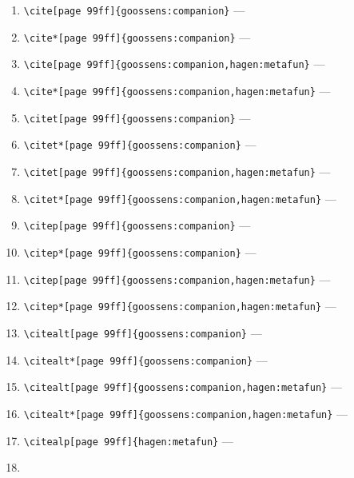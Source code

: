 \documentclass[12pt]{article}
\begin{document}
\begin{enumerate}
\item
\verb|\cite[page 99ff]{goossens:companion}| ---
\cite[page 99ff]{goossens:companion}
\item
\verb|\cite*[page 99ff]{goossens:companion}| ---
\cite*[page 99ff]{goossens:companion}
\item
\verb|\cite[page 99ff]{goossens:companion,hagen:metafun}| ---
\cite[page 99ff]{goossens:companion,hagen:metafun}
\item
\verb|\cite*[page 99ff]{goossens:companion,hagen:metafun}| ---
\cite*[page 99ff]{goossens:companion,hagen:metafun}
\item
\verb|\citet[page 99ff]{goossens:companion}| ---
\citet[page 99ff]{goossens:companion}
\item
\verb|\citet*[page 99ff]{goossens:companion}| ---
\citet*[page 99ff]{goossens:companion}
\item
\verb|\citet[page 99ff]{goossens:companion,hagen:metafun}| ---
\citet[page 99ff]{goossens:companion,hagen:metafun}
\item
\verb|\citet*[page 99ff]{goossens:companion,hagen:metafun}| ---
\citet*[page 99ff]{goossens:companion,hagen:metafun}
\item
\verb|\citep[page 99ff]{goossens:companion}| ---
\citep[page 99ff]{goossens:companion}
\item
\verb|\citep*[page 99ff]{goossens:companion}| ---
\citep*[page 99ff]{goossens:companion}
\item
\verb|\citep[page 99ff]{goossens:companion,hagen:metafun}| ---
\citep[page 99ff]{goossens:companion,hagen:metafun}
\item
\verb|\citep*[page 99ff]{goossens:companion,hagen:metafun}| ---
\citep*[page 99ff]{goossens:companion,hagen:metafun}
\item
\verb|\citealt[page 99ff]{goossens:companion}| ---
\citealt[page 99ff]{goossens:companion}
\item
\verb|\citealt*[page 99ff]{goossens:companion}| ---
\citealt*[page 99ff]{goossens:companion}
\item
\verb|\citealt[page 99ff]{goossens:companion,hagen:metafun}| ---
\citealt[page 99ff]{goossens:companion,hagen:metafun}
\item
\verb|\citealt*[page 99ff]{goossens:companion,hagen:metafun}| ---
\citealt*[page 99ff]{goossens:companion,hagen:metafun}
\item
\verb|\citealp[page 99ff]{hagen:metafun}| ---
\citealp[page 99ff]{hagen:metafun}
\item

\end{enumerate}
\end{document}

